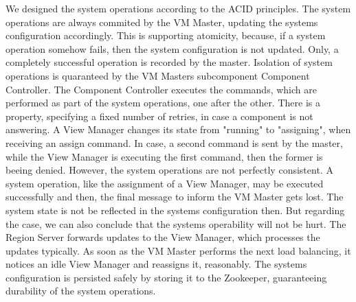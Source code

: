 \documentclass[11pt,a4paper,bibtotoc,idxtotoc,headsepline,footsepline,footexclude,BCOR12mm,DIV13]{scrbook}
\begin{document}
We designed the system operations according to the ACID principles. The system operations are always commited by the VM Master, updating the systems configuration accordingly. This is supporting atomicity, because, if a system operation somehow fails, then the system configuration is not updated. Only, a completely successful operation is recorded by the master. Isolation of system operations is quaranteed by the VM Masters subcomponent Component Controller. The Component Controller executes the commands, which are performed as part of the system operations, one after the other. There is a property, specifying a fixed number of retries, in case a component is not answering. A View Manager changes its state from "running" to "assigning", when receiving an assign command. In case, a second command is sent by the master, while the View Manager is executing the first command, then the former is beeing denied. However, the system operations are not perfectly consistent. A system operation, like the assignment of a View Manager, may be executed successfully and then, the final message to inform the VM Master gets lost. The system state is not be reflected in the systems configuration then. But regarding the case, we can also conclude that the systems operability will not be hurt. The Region Server forwards updates to the View Manager, which processes the updates typically. As soon as the VM Master performs the next load balancing, it notices an idle View Manager and reassigns it, reasonably. The systems configuration is persisted safely by storing it to the Zookeeper, guaranteeing durability of the system operations. 
\end{document}
